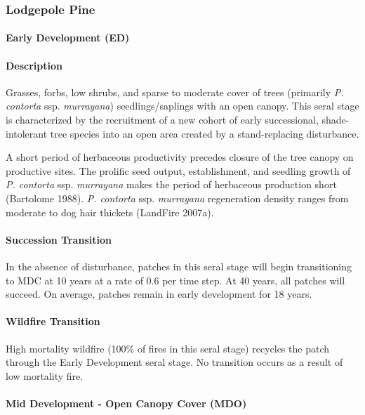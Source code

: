 \subsubsection{Lodgepole Pine}

\paragraph{Early Development (ED)}

\paragraph{Description} Grasses, forbs, low shrubs, and sparse to moderate cover of trees (primarily \emph{P. contorta} ssp. \emph{murrayana}) seedlings/saplings with an open canopy. This seral stage is characterized by the recruitment of a new cohort of early successional, shade-intolerant tree species into an open area created by a stand-replacing disturbance. 


A short period of herbaceous productivity precedes closure of the tree canopy on productive sites. The prolific seed output, establishment, and seedling growth of \emph{P. contorta} ssp. \emph{murrayana} makes the period of herbaceous production short (Bartolome 1988). \emph{P. contorta} ssp. \emph{murrayana} regeneration density ranges from moderate to dog hair thickets (LandFire 2007a).


\paragraph{Succession Transition} In the absence of disturbance, patches in this seral stage will begin transitioning to MDC at 10 years at a rate of 0.6 per time step. At 40 years, all patches will succeed. On average, patches remain in early development for 18 years.

\paragraph{Wildfire Transition} High mortality wildfire (100\% of fires in this seral stage) recycles the patch through the Early Development seral stage. No transition occurs as a result of low mortality fire.

\noindent\hrulefill


\paragraph{Mid Development - Open Canopy Cover (MDO)}

